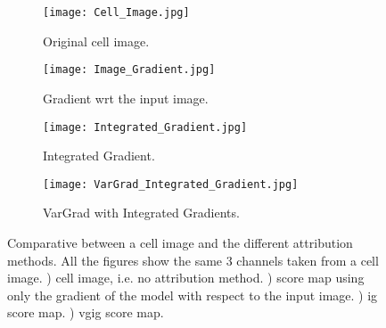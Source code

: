 \begin{figure}[!ht]
  \centering
  \begin{subfigure}[b]{.45\linewidth}
    \texttt{[image: Cell\_Image.jpg]}
    \caption{Original cell image.}
    \label{fig:vg:cell_img}
  \end{subfigure}
  \begin{subfigure}[b]{.45\linewidth}
    \texttt{[image: Image\_Gradient.jpg]}
    \caption{Gradient wrt the input image.}
    \label{fig:vg:img_gradients}
  \end{subfigure}%
  \vspace{3mm}
  \begin{subfigure}[b]{.45\linewidth}
    \texttt{[image: Integrated\_Gradient.jpg]}
    \caption{Integrated Gradient.}
    \label{fig:vg:img_IG}
  \end{subfigure}
  \begin{subfigure}[b]{.45\linewidth}
    \texttt{[image: VarGrad\_Integrated\_Gradient.jpg]}
    \caption{VarGrad with Integrated Gradients.}
    \label{fig:vg:img_VG_IG}
  \end{subfigure}
  \caption{Comparative between a cell image and the different attribution methods. All the figures show the same 3 channels taken from a cell image. ) cell image, i.e. no attribution method. ) score map using only the gradient of the model with respect to the input image. ) \acrlong{ig} score map. ) \acrlong{vgig} score map.}
  \label{fig:vg:comparative}
\end{figure}
